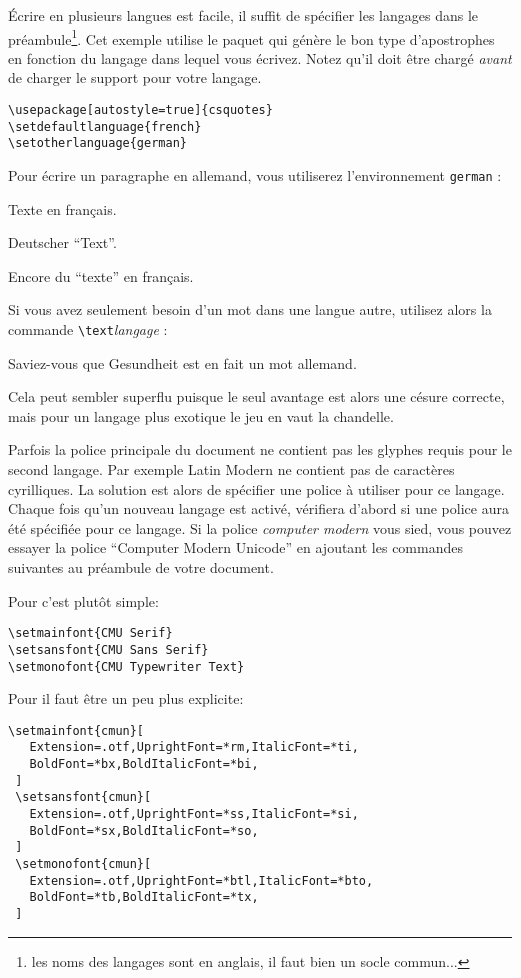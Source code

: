 Écrire en plusieurs langues est facile, il suffit de spécifier les
langages dans le préambule\footnote{les noms des langages sont en
  anglais, il faut bien un socle commun... \NdT}. Cet exemple utilise
le paquet  qui génère le bon type d'apostrophes en
fonction du langage dans lequel vous écrivez. Notez qu'il doit être
chargé \emph{avant} de charger le support pour votre langage.

\begin{lscommand}
\verb|\usepackage[autostyle=true]{csquotes}|\\
\verb|\setdefaultlanguage{french}|\\
\verb|\setotherlanguage{german}|
\end{lscommand}
%
Pour écrire un paragraphe en allemand, vous utiliserez l'environnement
\texttt{german} :

\begin{example}
Texte en français.
\begin{german}
Deutscher \enquote{Text}.
\end{german}
Encore du \enquote{texte} en français.
\end{example}

Si vous avez seulement besoin d'un mot dans une langue autre, utilisez
alors la commande \verb|\text|\emph{langage} :

\begin{example}
Saviez-vous que
\textgerman{Gesundheit} est
en fait un mot allemand.
\end{example}

Cela peut sembler superflu puisque le seul avantage est alors une
césure correcte, mais pour un langage plus exotique le jeu en vaut la
chandelle.

Parfois la police principale du document ne contient pas les glyphes
requis pour le second langage. Par exemple Latin Modern ne contient pas de
caractères cyrilliques. La solution est alors de spécifier une
police à utiliser pour ce langage. Chaque fois qu'un nouveau langage
est activé,  vérifiera d'abord si une police aura été
spécifiée pour ce langage.
Si la police \emph{computer modern} vous sied, vous pouvez essayer la
police \enquote{Computer Modern Unicode} en ajoutant les commandes
suivantes au préambule de votre document.

\medskip\noindent Pour  c'est plutôt simple:
\begin{verbatim}
\setmainfont{CMU Serif}
\setsansfont{CMU Sans Serif}
\setmonofont{CMU Typewriter Text}
\end{verbatim}
\noindent Pour  il faut être un peu plus explicite:
\begin{verbatim}
\setmainfont{cmun}[
   Extension=.otf,UprightFont=*rm,ItalicFont=*ti,
   BoldFont=*bx,BoldItalicFont=*bi,
 ]
 \setsansfont{cmun}[
   Extension=.otf,UprightFont=*ss,ItalicFont=*si,
   BoldFont=*sx,BoldItalicFont=*so,
 ]
 \setmonofont{cmun}[
   Extension=.otf,UprightFont=*btl,ItalicFont=*bto,
   BoldFont=*tb,BoldItalicFont=*tx,
 ]
\end{verbatim}

